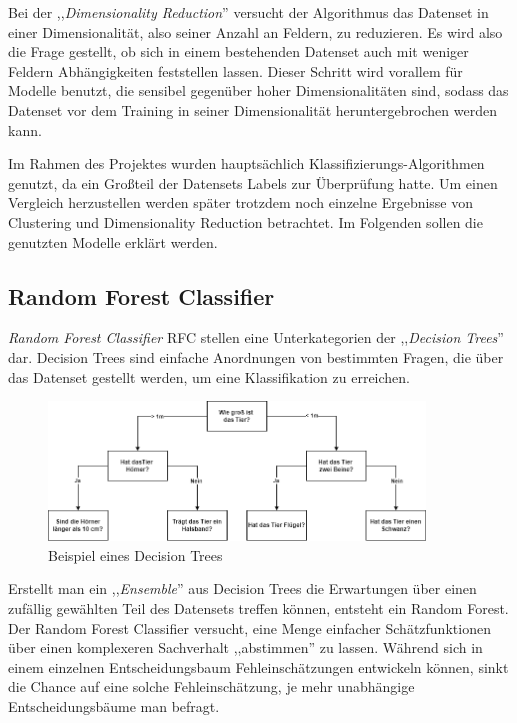 Bei der ,,\textit{Dimensionality Reduction}'' versucht der Algorithmus das Datenset in einer 
Dimensionalität, also seiner Anzahl an Feldern, zu reduzieren. Es wird also die Frage gestellt, 
ob sich in einem bestehenden Datenset auch mit weniger Feldern Abhängigkeiten feststellen lassen. Dieser 
Schritt wird vorallem für Modelle benutzt, die sensibel gegenüber hoher Dimensionalitäten sind, 
sodass das Datenset vor dem Training in seiner Dimensionalität heruntergebrochen werden kann.

Im Rahmen des Projektes wurden hauptsächlich Klassifizierungs-Algorithmen genutzt, da ein Großteil der 
Datensets Labels zur Überprüfung hatte. Um einen Vergleich herzustellen werden später trotzdem noch 
einzelne Ergebnisse von Clustering und Dimensionality Reduction betrachtet. Im Folgenden sollen die genutzten 
Modelle erklärt werden.

\subsection{Random Forest Classifier}

\textit{Random Forest Classifier} RFC stellen eine Unterkategorien der ,,\textit{Decision Trees}'' dar. Decision Trees sind einfache
Anordnungen von bestimmten Fragen, die über das Datenset gestellt werden, um eine Klassifikation zu erreichen.

\begin{figure}[h]
    \centering
    \includegraphics[width=10.0cm]{pic/DecisionTree.png}
    \caption{Beispiel eines Decision Trees}
    \label{fig:DT_Beispiel}
\end{figure}

Erstellt man ein ,,\textit{Ensemble}'' aus Decision Trees die Erwartungen über einen zufällig gewählten 
Teil des Datensets treffen können, entsteht ein Random Forest.
Der Random Forest Classifier versucht, eine Menge einfacher Schätzfunktionen über einen komplexeren 
Sachverhalt ,,abstimmen'' zu lassen. Während sich in einem einzelnen Entscheidungsbaum Fehleinschätzungen 
entwickeln können, sinkt die Chance auf eine solche Fehleinschätzung, je mehr unabhängige 
Entscheidungsbäume man befragt. 

